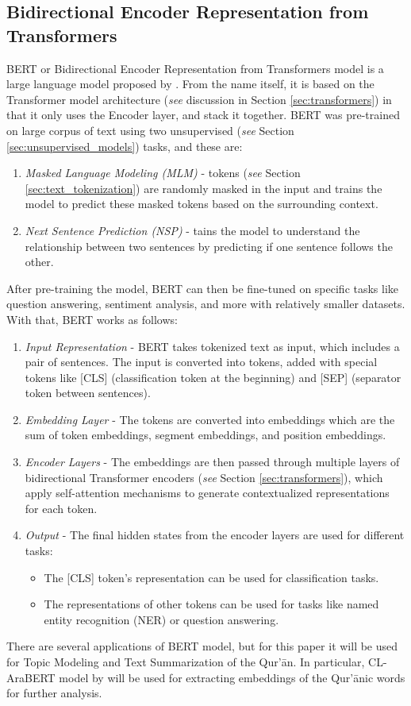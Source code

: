 \subsection{Bidirectional Encoder Representation from Transformers}\label{sec:bert}
BERT or Bidirectional Encoder Representation from Transformers model is a large language model proposed by . From the name itself, it is based on the Transformer model architecture (\textit{see} discussion in Section \ref{sec:transformers}) in that it only uses the Encoder layer, and stack it together. BERT was pre-trained on large corpus of text using two unsupervised (\textit{see} Section \ref{sec:unsupervised_models}) tasks, and these are:
\begin{enumerate}
    \item \textit{Masked Language Modeling (MLM)} - tokens (\textit{see} Section \ref{sec:text_tokenization}) are randomly masked in the input and trains the model to predict these masked tokens based on the surrounding context.
    \item \textit{Next Sentence Prediction (NSP)} - tains the model to understand the relationship between two sentences by predicting if one sentence follows the other.
\end{enumerate}
After pre-training the model, BERT can then be fine-tuned on specific tasks like question answering, sentiment analysis, and more with relatively smaller datasets. With that, BERT works as follows: 
\begin{enumerate}
    \item \textit{Input Representation} - BERT takes tokenized text as input, which includes a pair of sentences. The input is converted into tokens, added with special tokens like [CLS] (classification token at the beginning) and [SEP] (separator token between sentences).
    \item \textit{Embedding Layer} - The tokens are converted into embeddings which are the sum of token embeddings, segment embeddings, and position embeddings.
    \item \textit{Encoder Layers} - The embeddings are then passed through multiple layers of bidirectional Transformer encoders (\textit{see} Section \ref{sec:transformers}), which apply self-attention mechanisms to generate contextualized representations for each token.
    \item \textit{Output} - The final hidden states from the encoder layers are used for different tasks:
    \begin{itemize}
        \item The [CLS] token’s representation can be used for classification tasks.
        \item The representations of other tokens can be used for tasks like named entity recognition (NER) or question answering.
    \end{itemize}
\end{enumerate}
There are several applications of BERT model, but for this paper it will be used for Topic Modeling and Text Summarization of the Qur'\=an. In particular, CL-AraBERT model by will be used for extracting embeddings of the Qur'\=anic words for further analysis.
